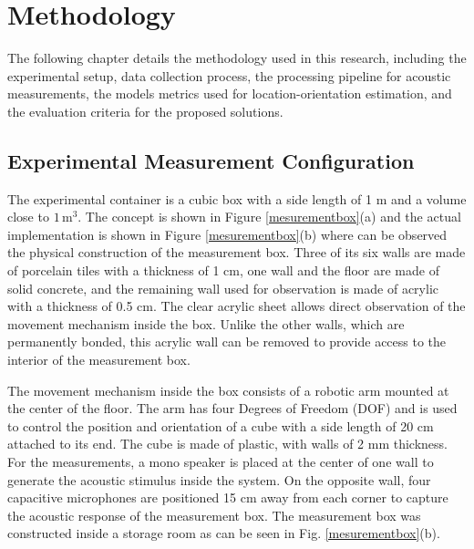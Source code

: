\chapter{Methodology}
\label{chapter:Methodology}

The following chapter details the methodology used in this research, including the experimental setup, data collection process, the processing pipeline for acoustic measurements, the models metrics used for location-orientation estimation, and the evaluation criteria for the proposed solutions.

   


 

\label{section:experiment-design}

\section{Experimental Measurement Configuration}


The experimental container is a cubic box with a side length of 1 m and a volume close to $1\,\mathrm{m}^3$. The concept is shown in Figure \ref{mesurementbox}(a) and the actual implementation is shown in Figure \ref{mesurementbox}(b) where can be observed the physical construction of the measurement box. Three of its six walls are made of porcelain tiles with a thickness of 1 cm, one wall and the floor are made of solid concrete, and the remaining wall used for observation is made of acrylic with a thickness of 0.5 cm. The clear acrylic sheet allows direct observation of the movement mechanism inside the box. Unlike the other walls, which are permanently bonded, this acrylic wall can be removed to provide access to the interior of the measurement box.

The movement mechanism inside the box consists of a robotic arm mounted at the center of the floor. The arm has four Degrees of Freedom (DOF) and is used to control the position and orientation of a cube with a side length of 20 cm attached to its end. The cube is made of plastic, with walls of 2 mm thickness. For the measurements, a mono speaker is placed at the center of one wall to generate the acoustic stimulus inside the system. On the opposite wall, four capacitive microphones are positioned 15 cm away from each corner to capture the acoustic response of the measurement box. The measurement box was constructed inside a storage room as can be seen in Fig. \ref{mesurementbox}(b).

